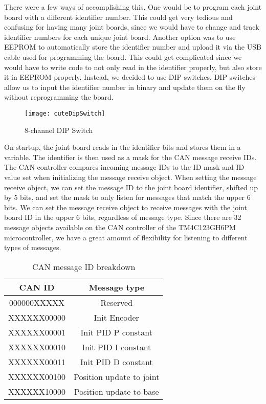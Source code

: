\noindent There were a few ways of accomplishing this. One would be to program each joint board with a different identifier number. This could get very tedious and confusing for having many joint boards, since we would have to change and track identifier numbers for each unique joint board. Another option was to use EEPROM to automatically store the identifier number and upload it via the USB cable used for programming the board. This could get complicated since we would have to write code to not only read in the identifier properly, but also store it in EEPROM properly. Instead, we decided to use DIP switches. DIP switches allow us to input the identifier number in binary and update them on the fly without reprogramming the board.

\begin{figure}[H]
\centering
\texttt{[image: cuteDipSwitch]}
\caption{8-channel DIP Switch}
\label{fig:8_channel DIP Switch}
\end{figure}

\noindent On startup, the joint board reads in the identifier bits and stores them in a variable. The identifier is then used as a mask for the CAN message receive IDs. The CAN controller compares incoming message IDs to the ID mask and ID value set when initializing the message receive object. When setting the message receive object, we can set the message ID to the joint board identifier, shifted up by 5 bits, and set the mask to only listen for messages that match the upper 6 bits. We can set the message receive object to receive messages with the joint board ID in the upper 6 bits, regardless of message type. Since there are 32 message objects available on the CAN controller of the TM4C123GH6PM microcontroller, we have a great amount of flexibility for listening to different types of messages.
\begin{table}
	\centering
	\caption{CAN message ID breakdown}
	\begin{tabular}{| c | c |}
		\hline
		CAN ID & Message type \\
		\hline
		\textsc{000000XXXXX} & Reserved \\
		\textsc{XXXXXX00000} & Init Encoder \\
		\textsc{XXXXXX00001} & Init PID P constant \\
		\textsc{XXXXXX00010} & Init PID I constant \\
		\textsc{XXXXXX00011} & Init PID D constant \\
		\textsc{XXXXXX00100} & Position update to joint \\
		\textsc{XXXXXX10000} & Position update to base\\
		\hline
	\end{tabular}
\end{table}

